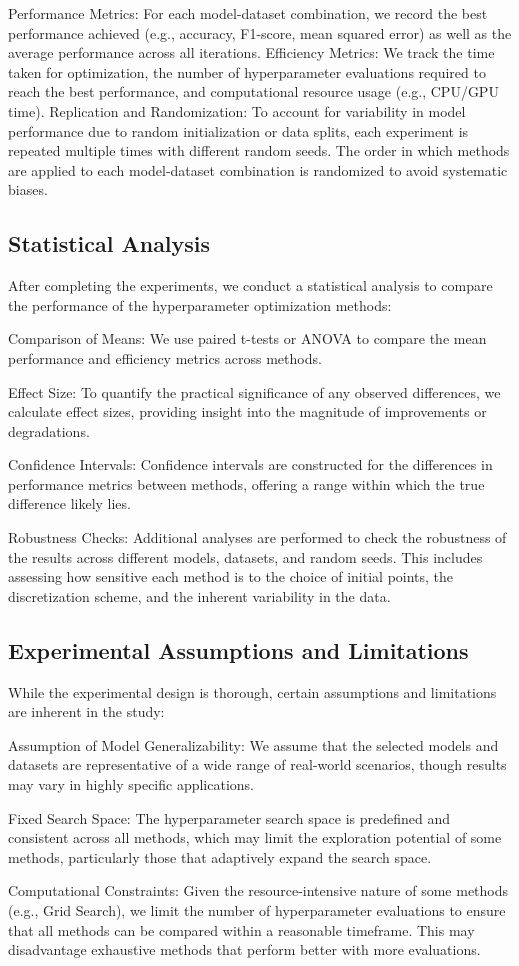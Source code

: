 Performance Metrics: For each model-dataset combination, we record the best performance achieved (e.g., accuracy, F1-score, mean squared error) as well as the average performance across all iterations.
Efficiency Metrics: We track the time taken for optimization, the number of hyperparameter evaluations required to reach the best performance, and computational resource usage (e.g., CPU/GPU time).
Replication and Randomization: To account for variability in model performance due to random initialization or data splits, each experiment is repeated multiple times with different random seeds. The order in which methods are applied to each model-dataset combination is randomized to avoid systematic biases.

\subsection{Statistical Analysis}

After completing the experiments, we conduct a statistical analysis to compare the performance of the hyperparameter optimization methods:

Comparison of Means: We use paired t-tests or ANOVA to compare the mean performance and efficiency metrics across methods.

Effect Size: To quantify the practical significance of any observed differences, we calculate effect sizes, providing insight into the magnitude of improvements or degradations.

Confidence Intervals: Confidence intervals are constructed for the differences in performance metrics between methods, offering a range within which the true difference likely lies.

Robustness Checks: Additional analyses are performed to check the robustness of the results across different models, datasets, and random seeds. This includes assessing how sensitive each method is to the choice of initial points, the discretization scheme, and the inherent variability in the data.

\subsection{Experimental Assumptions and Limitations}

While the experimental design is thorough, certain assumptions and limitations are inherent in the study:

Assumption of Model Generalizability: We assume that the selected models and datasets are representative of a wide range of real-world scenarios, though results may vary in highly specific applications.

Fixed Search Space: The hyperparameter search space is predefined and consistent across all methods, which may limit the exploration potential of some methods, particularly those that adaptively expand the search space.

Computational Constraints: Given the resource-intensive nature of some methods (e.g., Grid Search), we limit the number of hyperparameter evaluations to ensure that all methods can be compared within a reasonable timeframe. This may disadvantage exhaustive methods that perform better with more evaluations.

